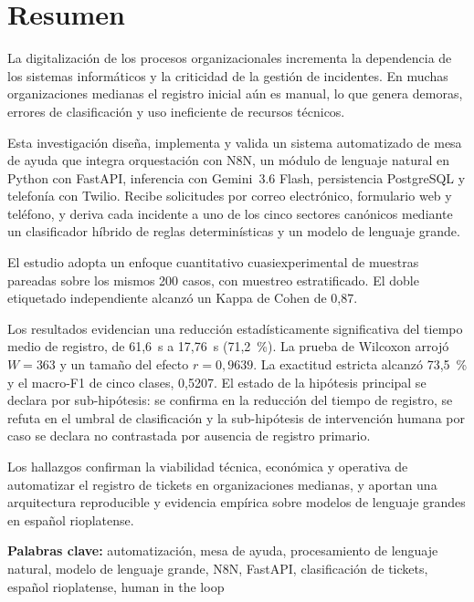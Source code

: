 \newpage
\section*{Resumen}

La digitalización de los procesos organizacionales incrementa la dependencia de los sistemas informáticos y la criticidad de la gestión de incidentes. En muchas organizaciones medianas el registro inicial aún es manual, lo que genera demoras, errores de clasificación y uso ineficiente de recursos técnicos.

Esta investigación diseña, implementa y valida un sistema automatizado de mesa de ayuda que integra orquestación con N8N, un módulo de lenguaje natural en Python con FastAPI, inferencia con Gemini~3.6 Flash, persistencia PostgreSQL y telefonía con Twilio. Recibe solicitudes por correo electrónico, formulario web y teléfono, y deriva cada incidente a uno de los cinco sectores canónicos mediante un clasificador híbrido de reglas determinísticas y un modelo de lenguaje grande.

El estudio adopta un enfoque cuantitativo cuasiexperimental de muestras pareadas sobre los mismos 200 casos, con muestreo estratificado. El doble etiquetado independiente alcanzó un Kappa de Cohen de 0,87.

Los resultados evidencian una reducción estadísticamente significativa del tiempo medio de registro, de 61,6~s a 17,76~s (71,2~\%). La prueba de Wilcoxon arrojó \(W = 363\) y un tamaño del efecto \(r = 0{,}9639\). La exactitud estricta alcanzó 73,5~\% y el macro-F1 de cinco clases, 0,5207. El estado de la hipótesis principal se declara por sub-hipótesis: se confirma en la reducción del tiempo de registro, se refuta en el umbral de clasificación y la sub-hipótesis de intervención humana por caso se declara no contrastada por ausencia de registro primario.

Los hallazgos confirman la viabilidad técnica, económica y operativa de automatizar el registro de tickets en organizaciones medianas, y aportan una arquitectura reproducible y evidencia empírica sobre modelos de lenguaje grandes en español rioplatense.

\bigskip
\noindent\textbf{Palabras clave:} automatización, mesa de ayuda, procesamiento de lenguaje natural, modelo de lenguaje grande, N8N, FastAPI, clasificación de tickets, español rioplatense, human in the loop

